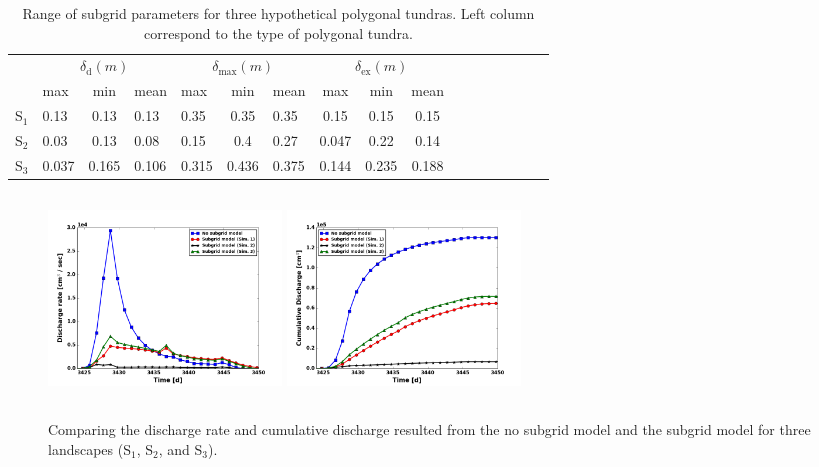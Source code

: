\documentclass[review,11pt]{elsarticle}
\begin{document}
\begin{table}
\caption{Range of subgrid parameters for three hypothetical polygonal tundras. Left column correspond to the type of polygonal tundra.}
\begin{tabular}{|p{9.5mm}|p{7mm}|c|p{7mm}|p{7mm}|c|p{7mm}|c|c|c|c|c|c|p{7mm}c|p{6mm}|c|}
\hline
\multirow{2}{*}{} & \multicolumn{3}{c|}{$\delta_\text{d}(m)$} & \multicolumn{3}{c|}{$\delta_\text{max}(m)$}  & \multicolumn{3}{c|}{$\delta_\text{ex}(m)$}  \\ \hhline{~---------}
& max & min & mean & max & min & mean & max & min & mean \\ \hline
S$_1$ & 0.13 & 0.13 & 0.13 & 0.35 & 0.35 & 0.35 & 0.15 & 0.15 & 0.15 \\
S$_2$ & 0.03 & 0.13 & 0.08 & 0.15 & 0.4 & 0.27 & 0.047 & 0.22 & 0.14 \\
S$_3$ & 0.037 & 0.165 & 0.106 & 0.315 & 0.436 & 0.375 & 0.144 & 0.235 & 0.188 \\ \hline
\end{tabular}
\label{dist-limits}
\end{table}


\begin{figure}[!h]
\centering 
\includegraphics[width=6.2cm, height=5.5cm]{./figures/MDM/DischargeRate-All-10yr.png}
\includegraphics[width=6.2cm, height=5.5cm]{./figures/MDM/CumulativeDischarge-All-10yr.png} 
\caption{Comparing the discharge rate and cumulative discharge resulted from the no subgrid model and the subgrid model for three landscapes (S$_1$, S$_2$, and S$_3$).}
\label{mdm-discharge}
\end{figure}
\end{document}
